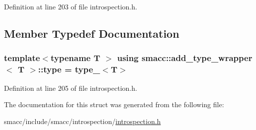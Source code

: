Definition at line 203 of file introspection.\+h.



\subsection{Member Typedef Documentation}
\subsubsection[{\texorpdfstring{type}{type}}]{\setlength{\rightskip}{0pt plus 5cm}template$<$typename T $>$ using {\bf smacc\+::add\+\_\+type\+\_\+wrapper}$<$ T $>$\+::{\bf type} =  {\bf type\+\_\+}$<$T$>$}\hypertarget{structsmacc_1_1add__type__wrapper_a3e5af90e35b5a70d9c4d952ef8011da9}{}\label{structsmacc_1_1add__type__wrapper_a3e5af90e35b5a70d9c4d952ef8011da9}


Definition at line 205 of file introspection.\+h.



The documentation for this struct was generated from the following file\+:\begin{DoxyCompactItemize}
\item 
smacc/include/smacc/introspection/\hyperlink{introspection_8h}{introspection.\+h}\end{DoxyCompactItemize}
